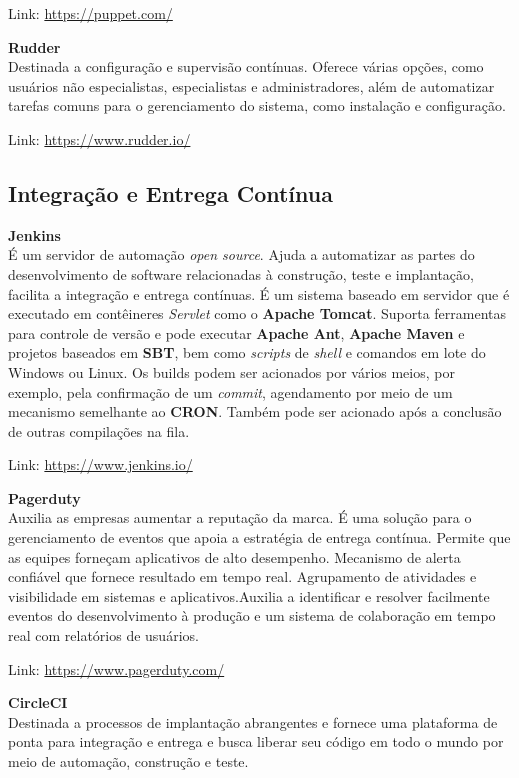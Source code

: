 \documentclass[fleqn,10pt]{SelfArx} %
\begin{document}
Link: \url{https://puppet.com/}

\textbf{Rudder} \\
Destinada a configuração e supervisão contínuas. Oferece várias opções, como usuários não especialistas, especialistas e administradores, além de automatizar tarefas comuns para o gerenciamento do sistema, como instalação e configuração.

Link: \url{https://www.rudder.io/}

\subsection*{Integração e Entrega Contínua}

\textbf{Jenkins} \\
É um servidor de automação \textit{open source}. Ajuda a automatizar as partes do desenvolvimento de software relacionadas à construção, teste e implantação, facilita a integração e entrega contínuas. É um sistema baseado em servidor que é executado em contêineres \textit{Servlet} como o \textbf{Apache Tomcat}. Suporta ferramentas para controle de versão e pode executar \textbf{Apache Ant}, \textbf{Apache Maven} e projetos baseados em \textbf{SBT}, bem como \textit{scripts} de \textit{shell} e comandos em lote do Windows ou Linux. Os builds podem ser acionados por vários meios, por exemplo, pela confirmação de um \textit{commit}, agendamento por meio de um mecanismo semelhante ao \textbf{CRON}. Também pode ser acionado após a conclusão de outras compilações na fila.

Link: \url{https://www.jenkins.io/}

\textbf{Pagerduty} \\
Auxilia as empresas aumentar a reputação da marca. É uma solução para o gerenciamento de eventos que apoia a estratégia de entrega contínua. Permite que as equipes forneçam aplicativos de alto desempenho. Mecanismo de alerta confiável que fornece resultado em tempo real. Agrupamento de atividades e visibilidade em sistemas e aplicativos.Auxilia a identificar e resolver facilmente eventos do desenvolvimento à produção e um sistema de colaboração em tempo real com relatórios de usuários.

Link: \url{https://www.pagerduty.com/}

\textbf{CircleCI} \\
Destinada a processos de implantação abrangentes e fornece uma plataforma de ponta para integração e entrega e busca liberar seu código em todo o mundo por meio de automação, construção e teste.
\end{document}
